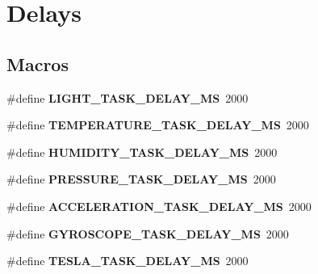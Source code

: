 \hypertarget{group___task}{}\section{Delays}
\label{group___task}
\subsection*{Macros}
\begin{DoxyCompactItemize}
\item 
\hypertarget{group___task_gaf9a40554579af64f0054eea09fddf152}{}\#define {\bfseries L\+I\+G\+H\+T\+\_\+\+T\+A\+S\+K\+\_\+\+D\+E\+L\+A\+Y\+\_\+\+M\+S}~2000\label{group___task_gaf9a40554579af64f0054eea09fddf152}

\item 
\hypertarget{group___task_ga4dd938820a6731a3de03902d4c9c151c}{}\#define {\bfseries T\+E\+M\+P\+E\+R\+A\+T\+U\+R\+E\+\_\+\+T\+A\+S\+K\+\_\+\+D\+E\+L\+A\+Y\+\_\+\+M\+S}~2000\label{group___task_ga4dd938820a6731a3de03902d4c9c151c}

\item 
\hypertarget{group___task_gae652a610cf22976579007cefe1d3580d}{}\#define {\bfseries H\+U\+M\+I\+D\+I\+T\+Y\+\_\+\+T\+A\+S\+K\+\_\+\+D\+E\+L\+A\+Y\+\_\+\+M\+S}~2000\label{group___task_gae652a610cf22976579007cefe1d3580d}

\item 
\hypertarget{group___task_ga7e6e75a554abf7c8727bbb5d0b39c636}{}\#define {\bfseries P\+R\+E\+S\+S\+U\+R\+E\+\_\+\+T\+A\+S\+K\+\_\+\+D\+E\+L\+A\+Y\+\_\+\+M\+S}~2000\label{group___task_ga7e6e75a554abf7c8727bbb5d0b39c636}

\item 
\hypertarget{group___task_gadfac62abd5ea468a900c41f1b7be811f}{}\#define {\bfseries A\+C\+C\+E\+L\+E\+R\+A\+T\+I\+O\+N\+\_\+\+T\+A\+S\+K\+\_\+\+D\+E\+L\+A\+Y\+\_\+\+M\+S}~2000\label{group___task_gadfac62abd5ea468a900c41f1b7be811f}

\item 
\hypertarget{group___task_ga63e095915f671180369b6cc8b2671e5d}{}\#define {\bfseries G\+Y\+R\+O\+S\+C\+O\+P\+E\+\_\+\+T\+A\+S\+K\+\_\+\+D\+E\+L\+A\+Y\+\_\+\+M\+S}~2000\label{group___task_ga63e095915f671180369b6cc8b2671e5d}

\item 
\hypertarget{group___task_ga59261b68f0b4c2c8276f8a98419223bf}{}\#define {\bfseries T\+E\+S\+L\+A\+\_\+\+T\+A\+S\+K\+\_\+\+D\+E\+L\+A\+Y\+\_\+\+M\+S}~2000\label{group___task_ga59261b68f0b4c2c8276f8a98419223bf}


\end{DoxyCompactItemize}
